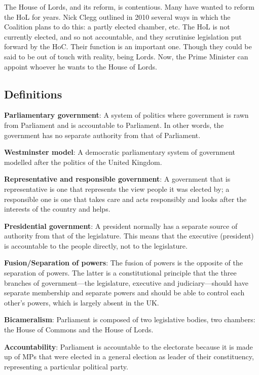 \documentclass[12pt]{article}
\begin{document}
The House of Lords, and its reform, is contentious.  Many have wanted to reform the HoL for years.  Nick Clegg outlined in 2010 several ways in which the Coalition plans to do this: a partly elected chamber, etc.  The HoL is not currently elected, and so not accountable, and they scrutinise legislation put forward by the HoC.  Their function is an important one.  Though they could be said to be out of touch with reality, being Lords.  Now, the Prime Minister can appoint whoever he wants to the House of Lords.

\subsection*{Definitions}

\textbf{Parliamentary government}: A system of politics where government is rawn from Parliament and is accountable to Parliament.  In other words, the government has no separate authority from that of Parliament.

\textbf{Westminster model}: A democratic parliamentary system of government modelled after the politics of the United Kingdom.

\textbf{Representative and responsible government}: A government that is representative is one that represents the view people it was elected by; a responsible one is one that takes care and acts responsibly and looks after the interests of the country and helps.

\textbf{Presidential government}: A president normally has a separate source of authority from that of the legislature.  This means that the executive (president) is accountable to the people directly, not to the legislature.

\textbf{Fusion/Separation of powers}: The fusion of powers is the opposite of the separation of powers.  The latter is a constitutional principle that the three branches of government---the legislature, executive and judiciary---should have separate membership and separate powers and should be able to control each other's powers, which is largely absent in the UK.

\textbf{Bicameralism}: Parliament is composed of two legislative bodies, two chambers: the House of Commons and the House of Lords.

\textbf{Accountability}: Parliament is accountable to the electorate because it is made up of MPs that were elected in a general election as leader of their constituency, representing a particular political party.
\end{document}
